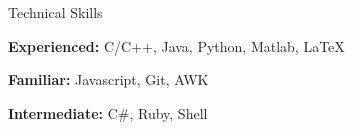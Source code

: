 \documentclass{resume} %
\begin{document}
\begin{rSection}{Technical Skills}
\item{}\textbf{Experienced: }C/C++, Java, Python, Matlab, LaTeX
\item{}\textbf{Familiar: }Javascript, Git, AWK
\item{}\textbf{Intermediate: }C\#, Ruby, Shell
\end{rSection}
\end{document}
